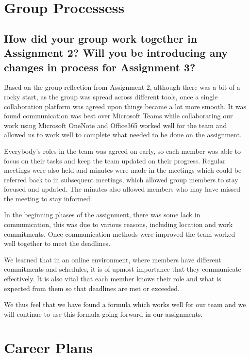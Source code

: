 \documentclass[11pt, oneside, a4paper, titlepage]{article}
\begin{document}
\section{Group Processess}

\subsection{How did your group work together in Assignment 2? Will you be introducing any changes in process for Assignment 3?}
Based on the group reflection from Assignment 2, although there was a bit of a rocky start, as the group was spread across different tools, once a single collaboration platform was agreed upon things became a lot more smooth. It was found communication was best over Microsoft Teams while collaborating our work using Microsoft OneNote and Office365 worked well for the team and allowed us to work well to complete what needed to be done on the assignment. 

Everybody’s roles in the team was agreed on early, so each member was able to focus on their tasks and keep the team updated on their progress. Regular meetings were also held and minutes were made in the meetings which could be referred back to in subsequent meetings, which allowed group members to stay focused and updated. The minutes also allowed members who may have missed the meeting to stay informed.  

In the beginning phases of the assignment, there was some lack in communication, this was due to various reasons, including location and work commitments. Once communication methods were improved the team worked well together to meet the deadlines.  

We learned that in an online environment, where members have different commitments and schedules, it is of upmost importance that they communicate effectively. It is also vital that each member knows their role and what is expected from them so that deadlines are met or exceeded. 

We thus feel that we have found a formula which works well for our team and we will continue to use this formula going forward in our assignments. 

\section{Career Plans}
\end{document}
